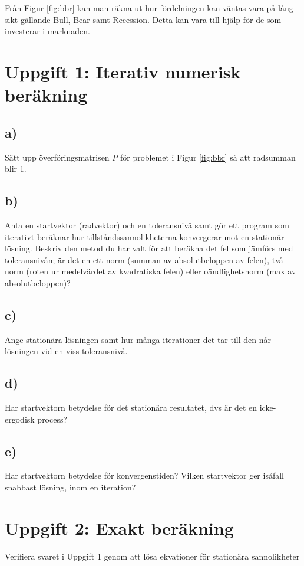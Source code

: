 \documentclass[a4paper]{article}
\begin{document}
Från Figur \ref{fig:bbr} kan man räkna ut hur fördelningen kan väntas vara på lång sikt gällande Bull, Bear samt Recession.
Detta kan vara till hjälp för de som investerar i marknaden.

\section{Uppgift 1: Iterativ numerisk beräkning}
\subsection{a)}
Sätt upp överföringsmatrisen \( P \) för problemet i Figur \ref{fig:bbr} så att radsumman blir 1.

\subsection{b)}
Anta en startvektor (radvektor) och en toleransnivå samt gör ett program som iterativt
beräknar hur tillståndssannolikheterna konvergerar mot en stationär lösning. Beskriv den
metod du har valt för att beräkna det fel som jämförs med toleransnivån; är det en ett-norm
(summan av absolutbeloppen av felen), två-norm (roten ur medelvärdet av kvadratiska
felen) eller oändlighetsnorm (max av absolutbeloppen)?

\subsection{c)}
Ange stationära lösningen samt hur många iterationer det tar till den når lösningen vid en
viss toleransnivå.

\subsection{d)}
Har startvektorn betydelse för det stationära resultatet, dvs är det en icke-ergodisk process?

\subsection{e)}
Har startvektorn betydelse för konvergenstiden? Vilken startvektor ger isåfall snabbast
lösning, inom en iteration?

\section{Uppgift 2: Exakt beräkning}
Verifiera svaret i Uppgift 1 genom att lösa ekvationer för stationära sannolikheter
\end{document}
